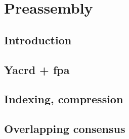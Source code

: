 \documentclass[main.tex]{subfiles}
\begin{document}
\chapter{Preassembly}

\section{Introduction}

\section{Yacrd + fpa}

\section{Indexing, compression}

\section{Overlapping consensus}
\end{document}
